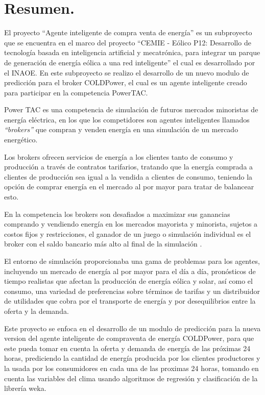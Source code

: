 
	\section*{Resumen.}   
El proyecto ``Agente inteligente de compra venta de energía'' es un subproyecto que se encuentra en el marco del proyecto 
``CEMIE - Eólico P12: Desarrollo de tecnología basada en inteligencia artificial y mecatrónica, para integrar un parque de generación de energía eólica a una red inteligente'' 
el cual es desarrollado por el INAOE. 
En este subproyecto se realizo el desarrollo de un nuevo modulo de predicción para el broker COLDPower, el cual es un agente inteligente creado para participar en la competencia PowerTAC. 

Power TAC es una competencia de simulación de futuros mercados minoristas de energía eléctrica, en los que los competidores son agentes inteligentes llamados \textit{``brokers''} que compran y venden energía en una simulación de un mercado energético. 

Los brokers ofrecen servicios de energía a los clientes tanto de consumo y producción a través de contratos tarifarios, tratando que la energía comprada a clientes de producción sea igual a la vendida a clientes de consumo, teniendo la opción de comprar energía en el mercado al por mayor para tratar de balancear esto.

En la competencia los brokers son desafiados a maximizar sus ganancias comprando y vendiendo energía en los mercados mayorista y minorista, sujetos a costos fijos y restricciones, el ganador de un juego o simulación individual es el broker con el saldo bancario más alto al final de la simulación \cite{WKetterJCollinsyMdWeerdtThe2017PowerTAC}.

El entorno  de simulación proporcionaba una gama de problemas para los agentes, incluyendo un mercado de energía al por mayor para el día a día, pronósticos de tiempo realistas que afectan la producción de energía eólica y solar, así como el consumo, una variedad de preferencias sobre términos de tarifas y un distribuidor de utilidades que cobra por el transporte de energía y por desequilibrios entre la oferta y la demanda.

Este proyecto se enfoca en el desarrollo de un modulo de predicción para la nueva version del agente inteligente de compraventa de energía COLDPower, para que este pueda tomar en cuenta la oferta y demanda de energía de las próximas 24 horas,  prediciendo la cantidad de energía producida por los clientes productores y la usada por los consumidores en cada una de las proximas 24 horas, tomando en cuenta las variables del clima usando algoritmos de regresión y clasificación de la librería weka.

